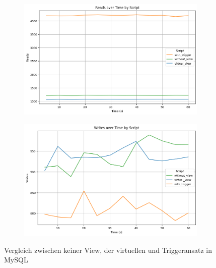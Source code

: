 \vspace{-9pt}
\begin{figure}[H]
    \centering
    \begin{subfigure}[t]{0.48\textwidth}
        \includegraphics[width=\textwidth]{PNGs/Script/Views/view-comparison/Reads}
    \end{subfigure}
    \hfill
    \begin{subfigure}[t]{0.48\textwidth}
        \includegraphics[width=\textwidth]{PNGs/Script/Views/view-comparison/Writes}
    \end{subfigure}
    \vspace{-6pt}
    \caption[Views: Keine View, virtuelle View und Ansatz mit Triggern]{Vergleich zwischen keiner View, der virtuellen und Triggeransatz in MySQL}
    \label{fig:view-comparison-comp-metric}
\end{figure}
\vspace{-15pt}

